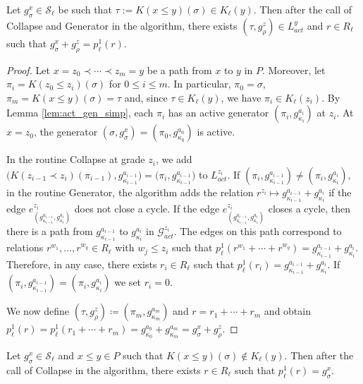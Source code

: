\documentclass[english,a4paper,nolineno,cleveref]{socg-lipics-v2021}
\begin{document}
\begin{lemma}\label{lemma:algo_2}
Let $g^x_\sigma\in\mathcal{S}_\ell$ be such that $\tau:=K(x\leq y)(\sigma)\in K_\ell(y)$. Then after the call of {\sc Collapse} and {\sc Generator} in the algorithm, there exists $(\tau,g^z_\rho)\in L^y_{act}$ and $r\in R_\ell$ such that $g^x_\sigma+g^z_\rho=p_\ell^1(r)$.
\end{lemma}

\begin{proof}
Let $x=z_0\prec\cdots\prec z_m=y$ be a path from $x$ to $y$ in $P$. Moreover, let $\pi_i=K(z_0\leq z_i)(\sigma)$ for $0\leq i\leq m$. In particular, $\pi_0=\sigma$, $\pi_m=K(x\leq y)(\sigma)=\tau$ and, since $\tau\in K_\ell(y)$, we have $\pi_i\in K_\ell(z_i)$. By Lemma \ref{lem:act_gen_simp}, each $\pi_i$ has an active generator $(\pi_i,g_{\kappa_i}^{a_i})$ at $z_i$. At $x=z_0$, the generator $(\sigma,g^x_\sigma)=(\pi_0,g_{\kappa_0}^{a_0})$ is active. 

In the routine {\sc Collapse} at grade $z_i$, we add $\big(K(z_{i\minus 1}\prec z_i)(\pi_{i\minus 1}),g_{\kappa_{i\minus 1}}^{a_{i\minus 1}}\big)=\big(\pi_i,g_{\kappa_{i\minus 1}}^{a_{i\minus 1}}\big)$ to $L_{act}^{z_i}$. If $(\pi_i,g_{\kappa_{i\minus 1}}^{a_{i\minus 1}})\neq (\pi_i,g_{\kappa_i}^{a_i})$, in the routine {\sc Generator}, the algorithm adds the relation $r^{z_i}\mapsto g^{a_{i\minus 1}}_{\kappa_{i\minus 1}}+g^{a_i}_{\kappa_i}$ if the edge $e^{z_i}_{(g^{a_{i\minus 1}}_{\kappa_{i\minus 1}},g^{a_i}_{\kappa_i})}$ does not close a cycle. If the edge $e^{z_i}_{(g^{a_{i\minus 1}}_{\kappa_{i\minus 1}},g^{a_i}_{\kappa_i})}$ closes a cycle, then there is a path from $g^{a_{i\minus 1}}_{\kappa_{i\minus 1}}$ to $g^{a_i}_{\kappa_i}$ in $\mathcal{G}_{act}^{z_i}$. The edges on this path correspond to relations $r^{w_1},\ldots,r^{w_q}\in R_\ell$ with $w_j\leq z_i$ such that $p_\ell^1(r^{w_1}+\cdots+r^{w_q})=g^{a_{i\minus 1}}_{\kappa_{i\minus 1}}+g^{a_i}_{\kappa_i}$. Therefore, in any case, there exists $r_i\in R_\ell$ such that $p_\ell^1(r_i)=g^{a_{i\minus 1}}_{\kappa_{i\minus 1}}+g^{a_i}_{\kappa_i}$. If $(\pi_i,g_{\kappa_{i\minus 1}}^{a_{i\minus 1}})=(\pi_i,g_{\kappa_i}^{a_i})$ we set $r_i=0$. 

We now define $(\tau,g^z_\rho)\coloneqq (\pi_m,g^{a_m}_{\kappa_m})$ and $r=r_1+\cdots+r_m$ and obtain
$p_\ell^1(r)=p_\ell^1(r_1+\cdots+r_m)=g^{a_0}_{\kappa_0}+g^{a_m}_{\kappa_m}=g^x_\sigma+g^{z}_\rho$.
\end{proof}

\begin{lemma}\label{lemma:algo_3}
Let $g^x_\sigma\in \mathcal{S}_\ell$ and $x\leq y\in P$ such that $K(x\leq y)(\sigma)\notin K_\ell(y)$. Then after the call of {\sc Collapse} in the algorithm, there exists $r\in R_\ell$ such that $p_\ell^1(r)=g^x_\sigma$.
\end{lemma}
\end{document}
